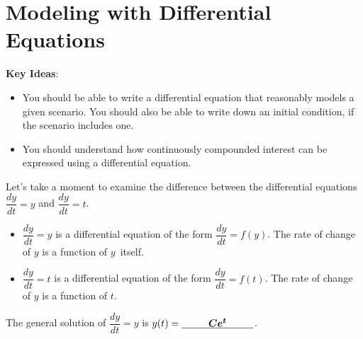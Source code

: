 \documentclass[main]{subfiles}
\begin{document}
\ifSubfilesClassLoaded{%
  \chaptermark{\chaptersix}
}{}

\section{Modeling with Differential Equations} \label{ws7-2}

\begin{problemonly}
    \begin{framed}

\textbf{Key Ideas}:

\begin{itemize}[topsep=0pt,partopsep=0pt,parsep=8pt,itemsep=0pt]

\item You should be able to write a differential equation that reasonably
  models a given scenario.  You should also be able to write down an
  initial condition, if the scenario includes one.

\item You should understand how continuously compounded interest can be
  expressed using a differential equation.

\end{itemize}
\end{framed}
\end{problemonly}

Let's take a moment to examine the difference between the differential equations 
$\dfrac{dy}{dt}=y$ and $\dfrac{dy}{dt}=t$.

\begin{itemize}[topsep=0pt]
    \item $\dfrac{dy}{dt}=y$ is a differential equation of the form
          $\dfrac{dy}{dt}=f(y)$. The rate of change of $y$ is a function
          of \mbox{$y$ itself.}
    \item $\dfrac{dy}{dt}=t$ is a differential equation of the form
          $\dfrac{dy}{dt}=f(t)$. The rate of change of $y$ is a function
          of $t$.
\end{itemize}

The general solution of $\dfrac{dy}{dt}=y$ is $y(t)=\cfitb{1in}{Ce^t}$.
\end{document}
